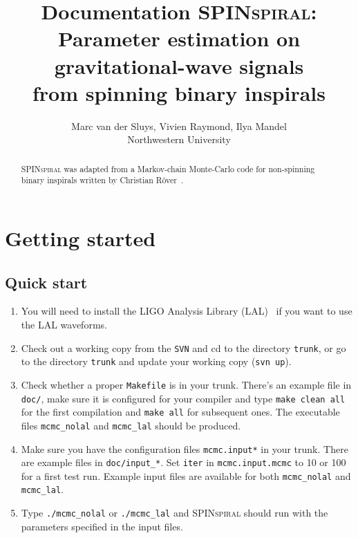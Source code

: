 \documentclass[10pt]{article}
\title{Documentation \textsc{SPINspiral}:\\
  Parameter estimation on gravitational-wave signals\\
  from spinning binary inspirals}
\author{Marc van der Sluys, Vivien Raymond, Ilya Mandel\\Northwestern University}
\begin{document}
\maketitle




\begin{abstract}
  \textsc{SPINspiral} was adapted from a Markov-chain Monte-Carlo code for non-spinning 
  binary inspirals written by Christian R\"over~\cite{RoeverThesis2007}.
\end{abstract}

\tableofcontents

\pagebreak


\section{Getting started}

\subsection{Quick start}

\begin{enumerate}
\item You will need to install the LIGO Analysis Library (LAL)~\cite{lal} if you want to use the LAL waveforms.
\item Check out a working copy from the \texttt{SVN} and cd to the directory \texttt{trunk}, or go to the
  directory \texttt{trunk} and update your working copy (\texttt{svn up}).
\item Check whether a proper \texttt{Makefile} is in your trunk.  There's an example file in \texttt{doc/}, 
make sure it is configured for your compiler and type \texttt{make clean all} for the first compilation
and \texttt{make all} for subsequent ones.  The executable files \texttt{mcmc\_nolal} and \texttt{mcmc\_lal} should be produced.
\item Make sure you have the configuration files \texttt{mcmc.input*} in your trunk.  There are example
files in \texttt{doc/input\_*}.  Set \texttt{iter} in \texttt{mcmc.input.mcmc} to 10 or 100 for a first test run.
Example input files are available for both \texttt{mcmc\_nolal} and \texttt{mcmc\_lal}.
\item Type \texttt{./mcmc\_nolal} or \texttt{./mcmc\_lal} and \textsc{SPINspiral} should run with the parameters specified
in the input files.
\end{enumerate}
\end{document}
